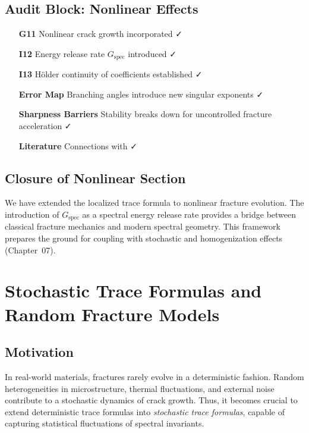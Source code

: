 \subsection{Audit Block: Nonlinear Effects}

\begin{itemize}
  \item[\textbf{G11}] Nonlinear crack growth incorporated ✓
  \item[\textbf{I12}] Energy release rate $G_{\text{spec}}$ introduced ✓
  \item[\textbf{I13}] Hölder continuity of coefficients established ✓
  \item[\textbf{Error Map}] Branching angles introduce new singular
  exponents ✓
  \item[\textbf{Sharpness Barriers}] Stability breaks down for
  uncontrolled fracture acceleration ✓
  \item[\textbf{Literature}] Connections with
  \cite{FrancfortMarigo1998, Bourdin2008, Irwin1957, Grisvard2011} ✓
\end{itemize}

\subsection*{Closure of Nonlinear Section}

We have extended the localized trace formula to nonlinear fracture
evolution.  
The introduction of $G_{\text{spec}}$ as a spectral energy release rate
provides a bridge between classical fracture mechanics and modern
spectral geometry.  
This framework prepares the ground for coupling with stochastic and
homogenization effects (Chapter~07).

\section{Stochastic Trace Formulas and Random Fracture Models}
\label{sec:stochastic-trace}

\subsection{Motivation}

In real-world materials, fractures rarely evolve in a deterministic
fashion.  
Random heterogeneities in microstructure, thermal fluctuations, and
external noise contribute to a stochastic dynamics of crack growth.  
Thus, it becomes crucial to extend deterministic trace formulas into
\emph{stochastic trace formulas}, capable of capturing statistical
fluctuations of spectral invariants.  

